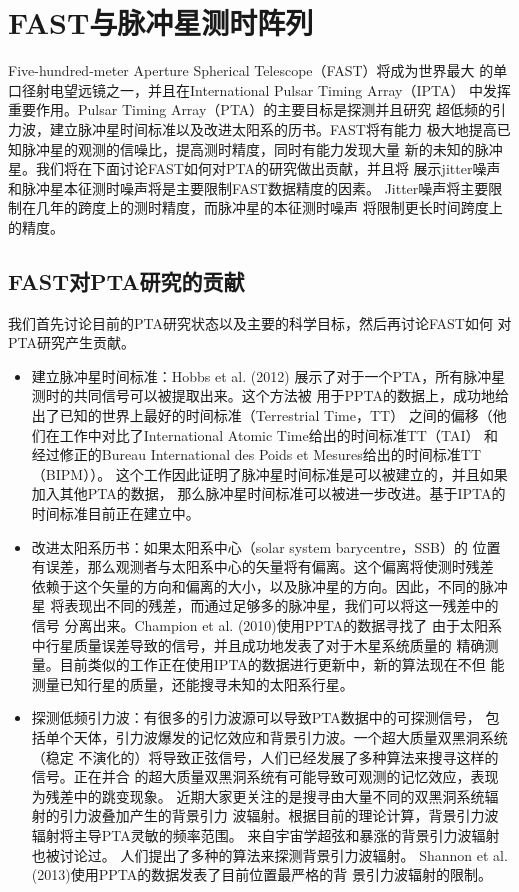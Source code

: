 \section{FAST与脉冲星测时阵列}

Five-hundred-meter Aperture Spherical Telescope（FAST）将成为世界最大
的单口径射电望远镜之一，并且在International Pulsar Timing Array（IPTA）
中发挥重要作用。Pulsar Timing Array（PTA）的主要目标是探测并且研究
超低频的引力波，建立脉冲星时间标准以及改进太阳系的历书。FAST将有能力
极大地提高已知脉冲星的观测的信噪比，提高测时精度，同时有能力发现大量
新的未知的脉冲星。我们将在下面讨论FAST如何对PTA的研究做出贡献，并且将
展示jitter噪声和脉冲星本征测时噪声将是主要限制FAST数据精度的因素。
Jitter噪声将主要限制在几年的跨度上的测时精度，而脉冲星的本征测时噪声
将限制更长时间跨度上的精度。

\subsection{FAST对PTA研究的贡献}

我们首先讨论目前的PTA研究状态以及主要的科学目标，然后再讨论FAST如何
对PTA研究产生贡献。

\begin{itemize}
\item 建立脉冲星时间标准：Hobbs et al. (2012)\supercite{hcm+12} 
展示了对于一个PTA，所有脉冲星测时的共同信号可以被提取出来。这个方法被
用于PPTA的数据上，成功地给出了已知的世界上最好的时间标准（Terrestrial Time，TT）
之间的偏移（他们在工作中对比了International Atomic Time给出的时间标准TT（TAI）
和经过修正的Bureau International des Poids et Mesures给出的时间标准TT（BIPM））。
这个工作因此证明了脉冲星时间标准是可以被建立的，并且如果加入其他PTA的数据，
那么脉冲星时间标准可以被进一步改进。基于IPTA的时间标准目前正在建立中。
\item 改进太阳系历书：如果太阳系中心（solar system barycentre，SSB）的
位置有误差，那么观测者与太阳系中心的矢量将有偏离。这个偏离将使测时残差
依赖于这个矢量的方向和偏离的大小，以及脉冲星的方向。因此，不同的脉冲星
将表现出不同的残差，而通过足够多的脉冲星，我们可以将这一残差中的信号
分离出来。Champion et al. (2010)\supercite{chm+10}使用PPTA的数据寻找了
由于太阳系中行星质量误差导致的信号，并且成功地发表了对于木星系统质量的
精确测量。目前类似的工作正在使用IPTA的数据进行更新中，新的算法现在不但
能测量已知行星的质量，还能搜寻未知的太阳系行星。
\item 探测低频引力波：有很多的引力波源可以导致PTA数据中的可探测信号，
包括单个天体，引力波爆发的记忆效应和背景引力波。一个超大质量双黑洞系统（稳定
不演化的）将导致正弦信号，人们已经发展了多种算法来搜寻这样的信号。正在并合
的超大质量双黑洞系统有可能导致可观测的记忆效应，表现为残差中的跳变现象\supercite{Wang15}。
近期大家更关注的是搜寻由大量不同的双黑洞系统辐射的引力波叠加产生的背景引力
波辐射。根据目前的理论计算，背景引力波辐射将主导PTA灵敏的频率范围\supercite{rwh+12}。
来自宇宙学超弦\supercite{oms10}和暴涨\supercite{tzz+14}的背景引力波辐射也被讨论过。
人们提出了多种的算法来探测背景引力波辐射\supercite{jhv+06,ych+11,vlj+11,dfg+13}。
Shannon et al. (2013)\supercite{Shannon13b}使用PPTA的数据发表了目前位置最严格的背
景引力波辐射的限制。
\end{itemize}

